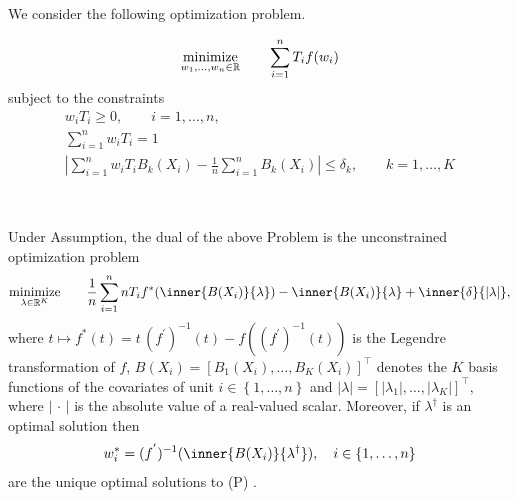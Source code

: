 We consider the following optimization problem.
\begin{problem}
  \begin{gather*}
    \underset{w_1, \ldots, w_n \in \mathbb{R}}{\mathrm{minimize}}
    \qquad
    \sum_{i = 1}^{n} T_i f(w_i)
  \end{gather*}
subject to the constraints
\begin{gather*}
    w_i T_i \ge 0,
    \qquad 
    i = 1, \ldots, n,
    \\
  \sum_{ i = 1 }^{n}
    w_i T_i
  =
  1
  \\
    \left| 
      \sum_{i = 1}^{n} w_i T_i B_k(X_i)
      - 
      \frac{1}{n} \sum_{i = 1}^{n} B_k(X_i)
    \right|
    \le 
    \delta_k,
    \qquad
    k = 1, \ldots, K
\end{gather*}
\end{problem}
\pagebreak
~\begin{ftheorem}
  Under Assumption,
  the dual of the above Problem is the unconstrained optimization problem 
  \begin{gather*}
    \underset{\lambda \in \R^K}{\mathrm{minimize}}
    \qquad
    \frac{1}{n}
    \sum_{i = 1}^{n} 
    nT_i 
    f^*
    (
      \inner{B(X_i)}{\lambda}
    )
    -
    \inner{B(X_i)}{\lambda}
    +
    \inner{\delta}{\left| \lambda \right|}
    ,
  \end{gather*}
  where
  $
  t \mapsto
    f^*(t)
    =
    t\,(f^{'})^{-1}(t)
    -
    f
    \left( 
      (f^{'})^{-1}(t)
    \right)
  $
  is the Legendre transformation of $f$,
  $
    B(X_i)
    =
    \left[ 
      B_1(X_i)
      ,
      \ldots
      ,
      B_K(X_i)
    \right]
    ^\top
  $
  denotes the $K$ basis functions of the covariates 
  of unit $i\in \left\{ 1, \ldots, n \right\}$
  and
  $
    \left| \lambda \right|
    =
    \left[ 
      \left| \lambda_1 \right|
      ,
      \ldots
      ,
      \left| \lambda_K \right|
    \right]
    ^\top
    ,
  $
  where $\left| \,\cdot\, \right|$
  is the absolute value of a real-valued scalar.
  Moreover, if $\lambda^\dagger$
  is an optimal solution then
  \begin{gather*}
    w_i^*
    =
    (f^{'})^{-1}
    (
      \inner{B(X_i)}{\lambda^\dagger}
    )
    ,
    \quad
    i\in \left\{ 1,\ldots, n \right\}
  \end{gather*}
  are the unique optimal solutions to (P)
  .
\end{ftheorem}
